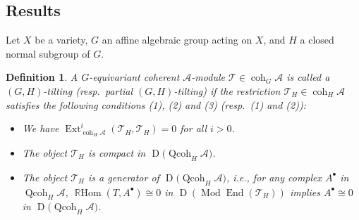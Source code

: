 \documentclass[pdftex]{sigma}%
\newtheorem{dfn}{Definition}[section]
\numberwithin{equation}{section}
\newcommand{\Ext}{\operatorname{Ext}}
\newcommand{\RHom}{\operatorname{{\mathbb R}Hom}}
\newcommand{\End}{\operatorname{End}}
\newcommand{\coh}{\operatorname{coh}}
\newcommand{\Qcoh}{\operatorname{Qcoh}}
\newcommand{\Mod}{\operatorname{Mod}}
\newcommand{\D}{\operatorname{D}}
\newcommand{\cA}{\mathcal{A}}
\newcommand{\cT}{\mathcal{T}}
\begin{document}
\subsection{Results}
 Let $X$ be a variety, $G$ an affine algebraic group acting on $X$, and $H$ a closed normal subgroup of $G$.
 \begin{dfn}
 A $G$-equivariant coherent $\cA$-module $\cT\in \coh_G\cA$ is called a {\it $(G,H)$-tilting} (resp.\ {\it partial $(G,H)$-tilting}) if the restriction $\cT_H\in \coh_H\cA$ satisfies the following conditions (1), (2) and (3) (resp.\ (1) and (2)):
 \begin{itemize}\itemsep=0pt
\item[$1.$] We have $\Ext_{\coh_H\cA}^i(\cT_H,\cT_H)=0$ for all $i>0$.

\item[$2.$] The object $\cT_H$ is {\it compact} in $\D\big(\Qcoh_H\cA\big)$.

\item[$3.$] The object $\cT_H$ is a {\it generator} of $\D\big(\Qcoh_H\cA\big)$, i.e., for any complex $A^{\bullet}$ in $\Qcoh_H\cA$, $\RHom(T,A^{\bullet})\cong0$ in $\D(\Mod\End(\cT_H))$ implies $A^{\bullet}\cong0$ in $\D\big(\Qcoh_H\cA\big)$.
\end{itemize}
 \end{dfn}
\end{document}
